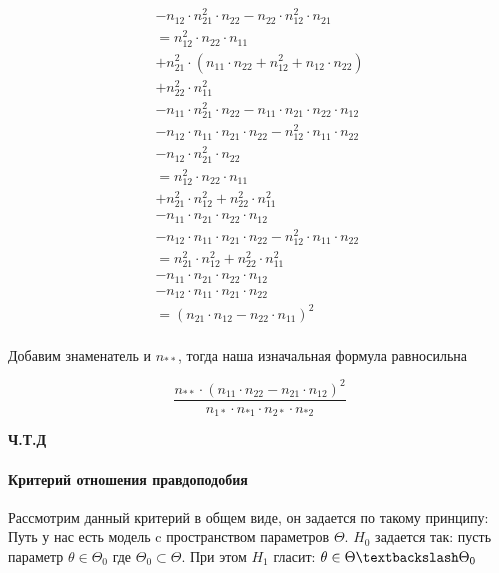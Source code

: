 \documentclass{article}
\begin{document}
\begin{multline*}
       - n_{12} \cdot n_{21}^{2} \cdot n_{22} - n_{22} \cdot n_{12}^{2} \cdot n_{21} \\
       = n_{12}^{2} \cdot n_{22} \cdot n_{11} \\
       + n_{21}^{2} \cdot (n_{11} \cdot n_{22} + n_{12}^{2} + n_{12} \cdot n_{22}) \\
       + n_{22}^{2} \cdot n_{11}^{2} \\
       - n_{11} \cdot n_{21}^{2} \cdot n_{22} - n_{11} \cdot n_{21} \cdot n_{22} \cdot n_{12} \\
       - n_{12} \cdot n_{11} \cdot n_{21} \cdot n_{22} - n_{12}^{2} \cdot n_{11} \cdot n_{22} \\
       - n_{12} \cdot n_{21}^{2} \cdot n_{22}  \\
       = n_{12}^{2} \cdot n_{22} \cdot n_{11} \\
       + n_{21}^{2} \cdot n_{12}^{2} + n_{22}^{2} \cdot n_{11}^{2} \\
       - n_{11} \cdot n_{21} \cdot n_{22} \cdot n_{12} \\
       - n_{12} \cdot n_{11} \cdot n_{21} \cdot n_{22} - n_{12}^{2} \cdot n_{11} \cdot n_{22} \\
       = n_{21}^{2} \cdot n_{12}^{2} + n_{22}^{2} \cdot n_{11}^{2} \\
       - n_{11} \cdot n_{21} \cdot n_{22} \cdot n_{12} \\
       - n_{12} \cdot n_{11} \cdot n_{21} \cdot n_{22} \\
       = (n_{21} \cdot n_{12} - n_{22} \cdot n_{11})^{2} \\
    \end{multline*}
    
    
    Добавим знаменатель и $n_{**}$, тогда наша изначальная формула равносильна 
    
    \begin{equation}
        \frac{n_{**} \cdot (n_{11}
        \cdot n_{22} - n_{21} \cdot n_{12})^{2}}{n_{1*} \cdot n_{*1} \cdot n_{2*} \cdot n_{*2}}
    \end{equation}
    
    \textbf{Ч.Т.Д}
    

    \paragraph{Критерий отношения правдоподобия}

    \quad

    Рассмотрим данный критерий в общем виде, он задается по такому принципу:
    Путь у нас есть модель c пространством параметров $\Theta$.
    $H_{0}$ задается так: пусть параметр $\theta \in \Theta_{0}$ где $\Theta_{0} \subset \Theta$.
    При этом $H_{1}$ гласит: $\theta \in \Theta \textbackslash \Theta_{0}$
\end{document}
